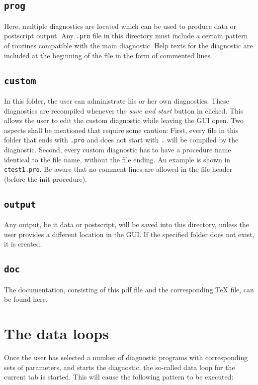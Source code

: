 \documentclass[12pt]{article}
\begin{document}
\subsection{\texttt{prog}}

Here, multiple diagnostics are located which can be used to
produce data or postscript output. Any \texttt{.pro} file in this
directory must include a certain pattern of routines compatible
with the main diagnostic. Help texts for the diagnostic are
included at the beginning of the file in the form of commented
lines.

\subsection{\texttt{custom}}

In this folder, the user can administrate his or her own
diagnostics. These diagnostics are recompiled whenever the
\emph{save and start} button in clicked. This allows the user to
edit the custom diagnostic while leaving the GUI open. Two aspects
shall be mentioned that require some caution: First, every file in
this folder that ends with \texttt{.pro} and does not start with
\texttt{.} will be compiled by the diagnostic. Second, every
custom diagnostic has to have a procedure name identical to the
file name, without the file ending. An example is shown in
\texttt{ctest1.pro}. Be aware that no comment lines are allowed in
the file header (before the init procedure).

\subsection{\texttt{output}}

Any output, be it data or postscript, will be saved into this
directory, unless the user provides a different location in the
GUI. If the specified folder does not exist, it is created.

\subsection{\texttt{doc}}

The documentation, consisting of this pdf file and the
corresponding TeX file, can be found here.


\section{The data loops}

Once the user has selected a number of diagnostic programs with
corresponding sets of parameters, and starts the diagnostic, the
so-called data loop for the current tab is started. 
This will cause the following pattern to be executed:
\end{document}
